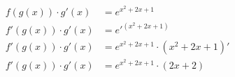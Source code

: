 \documentclass[preview]{standalone}
\begin{document}
\begin{align*}
f(g(x)) \cdot g'(x)&=e^{x^2+2x+1}\\ f'(g(x))\cdot g'(x)&=e'^{(x^2+2x+1)}\\ f'(g(x))\cdot g'(x)&=e^{x^2+2x+1} \cdot (x^2+2x+1)'\\ f'(g(x))\cdot g'(x)&=e^{x^2+2x+1} \cdot (2x+2)
\end{align*}
\end{document}
